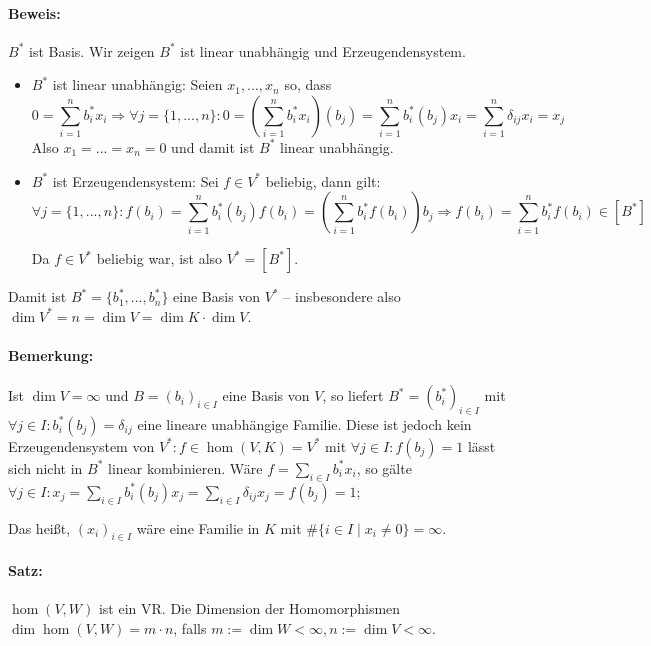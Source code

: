 \paragraph{Beweis:} $B^*$ ist Basis. Wir zeigen $B^*$ ist linear unabhängig und Erzeugendensystem.
	\begin{itemize}
            \item $ B^* $ ist linear unabhängig: Seien $ x_1,...,x_n $ so, dass
                    \begin{equation*}
                    0 = \sum_{i=1}^{n}b_i^*x_i \Rightarrow \forall j=\{1,...,n\}:0=(\sum_{i=1}^{n}b_i^*x_i)(b_j) = \sum_{i=1}^{n}b_i^*(b_j)x_i = \sum_{i=1}^{n}\delta_{ij}x_i = x_j
                    \end{equation*}
            Also $ x_1 = ... = x_n = 0 $ und damit ist $ B^* $ linear unabhängig.
            \item $ B^* $ ist Erzeugendensystem: Sei $ f\in V^* $ beliebig, dann gilt:
            \begin{equation*}
                    \forall j = \{1,...,n\}:f(b_i) = \sum_{i=1}^{n}b_i^*(b_j)f(b_i) = (\sum_{i=1}^{n}b_i^*f(b_i))b_j \Rightarrow f(b_i) = \sum_{i=1}^{n}b_i^*f(b_i)\in [B^*]
            \end{equation*}
            
            Da $ f\in V^* $ beliebig war, ist also $ V^* = [B^*]$.
	\end{itemize}
	
	Damit ist $ B^* = \{b_1^*,...,b_n^*\}$ eine Basis von $ V^* $ -- insbesondere also $ \dim V^* = n = \dim V = \dim K\cdot \dim V $.

\paragraph{Bemerkung:}
	Ist $\dim V = \infty$ und $B=(b_i)_{i\in I}$ eine Basis von $V$, so liefert $B^\ast=(b_i^\ast)_{i\in I}$ mit $\forall j\in I:b_i^\ast(b_j)=\delta_{ij}$ eine lineare unabhängige Familie. Diese ist jedoch kein Erzeugendensystem von $V^\ast: f\in\hom(V,K)=V^\ast$ mit $\forall j\in I:f(b_j)=1$ lässt sich nicht in $B^\ast$ linear kombinieren. Wäre $f=\sum_{i\in I}b_i^\ast x_i$, so gälte $\forall j\in I: x_j =\sum_{i\in I}b_i^\ast(b_j)x_j= \sum_{i\in I} \delta_{ij}x_j = f(b_j) = 1$; 

	Das heißt, $(x_i)_{i\in I}$ wäre eine Familie in $ K $ mit $\#\{i\in I\mid x_i\neq 0\}=\infty$.

\paragraph{Satz:}
	$ \hom (V,W) $ ist ein VR. Die Dimension der Homomorphismen $\dim\hom (V,W) = m\cdot n$, falls $m:=\dim W<\infty, n:=\dim V< \infty$.
	
